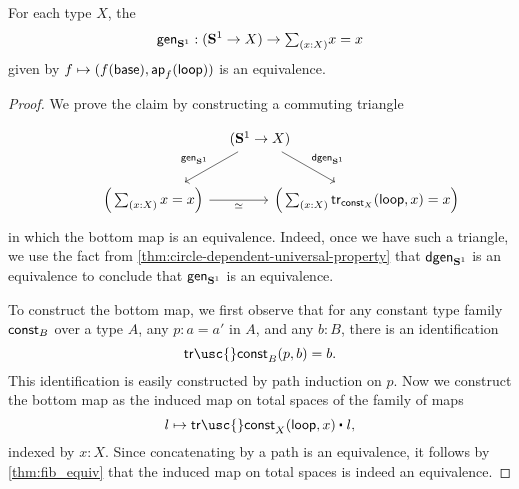 \begin{thm}\label{thm:circle_up} 
For each type $X$, the 
\begin{equation*}
\mathsf{gen}_{\sphere{1}}:(\sphere{1}\to X)\to \sm{x:X}x=x
\end{equation*}
given by $f\mapsto (f(\mathsf{base}),\mathsf{ap}_{f}({\mathsf{loop}}))$ is an equivalence.
\end{thm}

\begin{proof}
  We prove the claim by constructing a commuting triangle
  \begin{equation*}
    \begin{tikzcd}[column sep=-2em]
      \phantom{\Big(\sm{x:X}\tr_{\const_X}(\lloop,x)=x\Big)} & (\sphere{1}\to X) \arrow[dl,swap,"\gen_{\sphere{1}}"] \arrow[dr,"\dgen_{\sphere{1}}"] \\
      \Big(\sm{x:X}x=x\Big) \arrow[rr,swap,"\simeq"] & & \Big(\sm{x:X}\tr_{\const_X}(\lloop,x)=x\Big)
    \end{tikzcd}
  \end{equation*}
  in which the bottom map is an equivalence. Indeed, once we have such a triangle, we use the fact from \cref{thm:circle-dependent-universal-property} that $\mathsf{dgen}_{\mathbf{S}^{1}}$ is an equivalence to conclude that $\mathsf{gen}_{\mathbf{S}^{1}}$ is an equivalence.

  To construct the bottom map, we first observe that for any constant type family $\mathsf{const}_B$ over a type $A$, any $p:a=a'$ in $A$, and any $b:B$, there is an identification
  \begin{equation*}
    \mathsf{tr\usc{}const}_B(p,b)=b.
  \end{equation*}
  This identification is easily constructed by path induction on $p$. Now we construct the bottom map as the induced map on total spaces of the family of maps
  \begin{equation*}
    l\mapsto \ct{\mathsf{tr\usc{}const}_X(\lloop,x)}{l},
  \end{equation*}
  indexed by $x:X$. Since concatenating by a path is an equivalence, it follows by \cref{thm:fib_equiv} that the induced map on total spaces is indeed an equivalence.


\end{proof}
